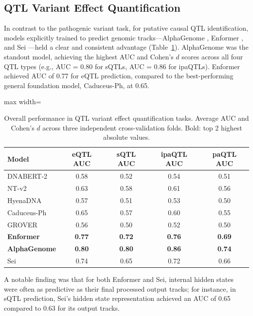 \documentclass{article}
\begin{document}
\subsection{QTL Variant Effect Quantification}

In contrast to the pathogenic variant task, for putative causal QTL identification, models explicitly trained to predict genomic tracks---AlphaGenome \citep{alphagenome2024}, Enformer \citep{avsec2021effective}, and Sei \citep{chen2022sei}---held a clear and consistent advantage (Table~\ref{tab:qtl}). AlphaGenome was the standout model, achieving the highest AUC and Cohen's $d$ scores across all four QTL types (e.g., AUC = 0.80 for sQTLs, AUC = 0.86 for ipaQTLs). Enformer achieved AUC of 0.77 for eQTL prediction, compared to the best-performing general foundation model, Caduceus-Ph, at 0.65.

\begin{table}[htbp]
\centering
\caption{Overall performance in QTL variant effect quantification tasks. Average AUC and Cohen's $d$ across three independent cross-validation folds. Bold: top 2 highest absolute values.}
\label{tab:qtl}
\begin{adjustbox}{max width=\textwidth}
\begin{tabular}{lcccc}
\toprule
Model & eQTL AUC & sQTL AUC & ipaQTL AUC & paQTL AUC \\
\midrule
DNABERT-2 & 0.58 & 0.52 & 0.54 & 0.51 \\
NT-v2 & 0.63 & 0.58 & 0.61 & 0.56 \\
HyenaDNA & 0.57 & 0.51 & 0.53 & 0.50 \\
Caduceus-Ph & 0.65 & 0.57 & 0.60 & 0.55 \\
GROVER & 0.56 & 0.50 & 0.52 & 0.50 \\
\textbf{Enformer} & \textbf{0.77} & \textbf{0.72} & \textbf{0.76} & \textbf{0.69} \\
\textbf{AlphaGenome} & \textbf{0.80} & \textbf{0.80} & \textbf{0.86} & \textbf{0.74} \\
Sei & 0.74 & 0.65 & 0.72 & 0.66 \\
\bottomrule
\end{tabular}
\end{adjustbox}
\end{table}

A notable finding was that for both Enformer and Sei, internal hidden states were often as predictive as their final processed output tracks; for instance, in sQTL prediction, Sei's hidden state representation achieved an AUC of 0.65 compared to 0.63 for its output tracks.
\end{document}

